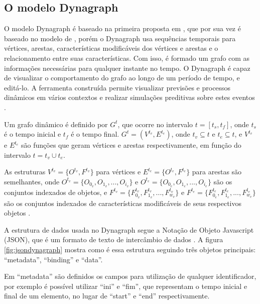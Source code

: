 \pagebreak

\subsection{O modelo Dynagraph}
O modelo Dynagraph \cite{dynagraph} é baseado na primeira proposta em \cite{dynagraph2012}, que por sua vez é baseado no modelo
de \cite{kim}, porém o Dynagraph usa sequências temporais para vértices, arestas, características modificáveis dos vértices e arestas e
o relacionamento entre suas características. Com isso, é formado um grafo com as informações necessárias para qualquer instante no tempo.
O Dynagraph é capaz de visualizar o comportamento do grafo ao longo de um período de tempo, e editá-lo. A ferramenta construída permite
visualizar previsões e processos dinâmicos em vários contextos e realizar simulações preditivas sobre estes eventos \cite{dynagraph}.

Um grafo dinâmico é definido por $G^t$, que ocorre no intervalo $t = [t_s,t_f]$, onde $t_s$ é o tempo inicial e $t_f$ é o tempo final.
$G^t = (V^{t_v}, E^{t_e})$, onde $t_v \subseteq t$ e $t_e \subseteq t$, e $V^{t_v}$ e $E^{t_e}$ são funções que geram vértices e arestas
respectivamente, em função do intervalo $t=t_v \cup t_e$.

As estruturas $V^{t_v} = \{O^{t_v}, F^{t_v}\}$ para vértices e $E^{t_e} = \{O^{t_e}, F^{t_e}\}$ para arestas são semelhantes,
onde $O^{t_v} = \{O_{0_v}, O_{1_v},..., O_{i_v}\}$ e $O^{t_e} = \{O_{0_e}, O_{1_e},..., O_{i_e}\}$ são os conjuntos indexados de objetos,
e $F^{t_v} = \{F^{t_v}_{0_v}, F^{t_v}_{1_v},..., F^{t_v}_{w_v}\}$ e $F^{t_e} = \{F^{t_e}_{0_e}, F^{t_e}_{1_e},..., F^{t_e}_{w_e}\}$ são os
conjuntos indexados de características modificáveis de seus respectivos objetos \cite{dynagraph}.

A estrutura de dados usada no Dynagraph segue a Notação de Objeto Javascript (JSON), que é um formato de texto de intercâmbio de dados \cite{douglas}.
A figura \ref{fig:jsondynagraph} mostra como é essa estrutura seguindo três objetos principais: ``metadata'', ``binding'' e ``data''.

Em ``metadata'' são definidos os campos para utilização de qualquer identificador, por exemplo é possível utilizar ``ini'' e ``fim'',
que representam o tempo inicial e final de um elemento, no lugar de ``start'' e ``end'' respectivamente.

